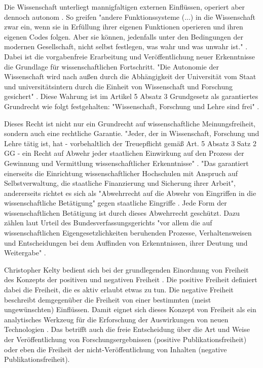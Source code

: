 Die Wissenschaft unterliegt mannigfaltigen externen Einflüssen, operiert aber dennoch autonom \cite{Luhmann1998}. So greifen "andere Funktionssysteme (...) in die Wissenschaft zwar ein, wenn sie in Erfüllung ihrer eigenen Funktionen operieren und ihren eigenen Codes folgen. Aber sie können, jedenfalls unter den Bedingungen der modernen Gesellschaft, nicht selbst festlegen, was wahr und was unwahr ist."  \cite{Luhmann1998}. Dabei ist die vorgabenfreie Erarbeitung und Veröffentlichung neuer Erkenntnisse die Grundlage für wissenschaftlichen Fortschritt. "Die Autonomie der Wissenschaft wird nach außen durch die Abhängigkeit der Universität vom Staat und universitätsintern durch die Einheit von Wissenschaft und Forschung gesichert" \cite{Huber_2005}. Diese Wahrung ist im Artikel 5 Absatz 3 Grundgesetz als garantiertes Grundrecht wie folgt festgehalten: "Wissenschaft, Forschung und Lehre sind frei" \cite{suchen_GG}.

Dieses Recht ist nicht nur ein Grundrecht auf wissenschaftliche Meinungsfreiheit, sondern auch eine rechtliche Garantie. "Jeder, der in Wissenschaft, Forschung und Lehre tätig ist, hat - vorbehaltlich der Treuepflicht gemäß Art. 5 Absatz 3 Satz 2 GG - ein Recht auf Abwehr jeder staatlichen Einwirkung auf den Prozess der Gewinnung und Vermittlung wissenschaftlicher Erkenntnisse" \cite{suchen_BVG}. "Das garantiert einerseits die Einrichtung wissenschaftlicher Hochschulen mit Anspruch auf Selbstverwaltung, die staatliche Finanzierung und Sicherung ihrer Arbeit"\cite{suchen_BVG}, andererseits richtet es sich als "Abwehrrecht auf die Abwehr von Eingriffen in die wissenschaftliche Betätigung" gegen staatliche Eingriffe \cite{mayen_grundrechte_forscher} \cite{spindler_2006_rechtloa}. Jede Form der wissenschaftlichen Betätigung ist durch dieses Abwehrrecht geschützt. Dazu zählen laut Urteil des Bundesverfassungsgerichts "vor allem die auf wissenschaftlichen Eigengesetzlichkeiten beruhenden Prozesse, Verhaltensweisen und Entscheidungen bei dem Auffinden von Erkenntnissen, ihrer Deutung und Weitergabe" \cite{suchen}.

Christopher Kelty bedient sich bei der grundlegenden Einordnung von Freiheit des Konzepts der positiven und negativen Freiheit \cite{kelty_2014_freedom}. Die positive Freiheit definiert dabei die Freiheit, die es aktiv erlaubt etwas zu tun. Die negative Freiheit beschreibt demgegenüber die Freiheit von einer bestimmten (meist ungewünschten) Einflüssen. Damit eignet sich dieses Konzept von Freiheit als ein analytisches Werkzeug für die Erforschung der Auswirkungen von neuen Technologien \cite{kelty_2014_freedom}. Das betrifft auch die freie Entscheidung über die Art und Weise der Veröffentlichung von Forschungsergebnissen (positive Publikationsfreiheit) \cite{Fangerau_2014} \cite[:190]{Fehling_2014} oder eben die Freiheit der nicht-Veröffentlichung von Inhalten (negative Publikationsfreiheit).

